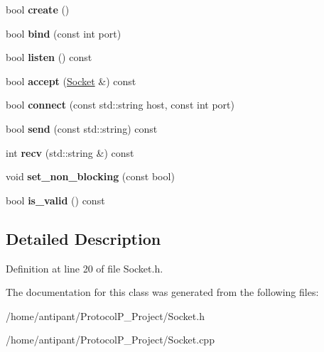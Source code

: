 \begin{DoxyCompactItemize}
\item 
\hypertarget{classSocket_a6afde2dca985dacdfa770141192e2daf}{bool {\bfseries create} ()}\label{classSocket_a6afde2dca985dacdfa770141192e2daf}

\item 
\hypertarget{classSocket_abfc7244009defd5c5e1ad173142a5059}{bool {\bfseries bind} (const int port)}\label{classSocket_abfc7244009defd5c5e1ad173142a5059}

\item 
\hypertarget{classSocket_a0988791cca0cc0eeee0c854500d7f527}{bool {\bfseries listen} () const }\label{classSocket_a0988791cca0cc0eeee0c854500d7f527}

\item 
\hypertarget{classSocket_a068f789510d289f59a1fc1f51fbb9ed3}{bool {\bfseries accept} (\hyperlink{classSocket}{Socket} \&) const }\label{classSocket_a068f789510d289f59a1fc1f51fbb9ed3}

\item 
\hypertarget{classSocket_afe535648cf44461c6ded1b2d72056d47}{bool {\bfseries connect} (const std\-::string host, const int port)}\label{classSocket_afe535648cf44461c6ded1b2d72056d47}

\item 
\hypertarget{classSocket_a011c857282aadbfde92558985e0191cd}{bool {\bfseries send} (const std\-::string) const }\label{classSocket_a011c857282aadbfde92558985e0191cd}

\item 
\hypertarget{classSocket_af6cbe662cffa8f593f9c0e42440180f3}{int {\bfseries recv} (std\-::string \&) const }\label{classSocket_af6cbe662cffa8f593f9c0e42440180f3}

\item 
\hypertarget{classSocket_ac4d1d5bc09e469b72f52fbcf758a5cf0}{void {\bfseries set\-\_\-non\-\_\-blocking} (const bool)}\label{classSocket_ac4d1d5bc09e469b72f52fbcf758a5cf0}

\item 
\hypertarget{classSocket_a157f83a7404aec259c58783cd9af6ea6}{bool {\bfseries is\-\_\-valid} () const }\label{classSocket_a157f83a7404aec259c58783cd9af6ea6}

\end{DoxyCompactItemize}


\subsection{Detailed Description}


Definition at line 20 of file Socket.\-h.



The documentation for this class was generated from the following files\-:\begin{DoxyCompactItemize}
\item 
/home/antipant/\-Protocol\-P\-\_\-\-Project/Socket.\-h\item 
/home/antipant/\-Protocol\-P\-\_\-\-Project/Socket.\-cpp\end{DoxyCompactItemize}
